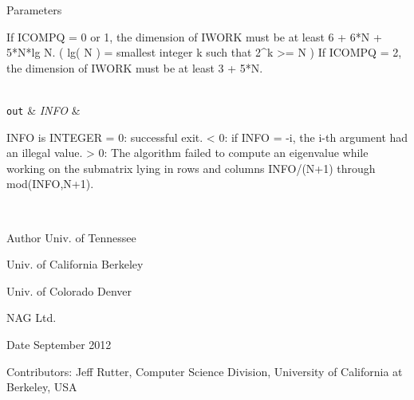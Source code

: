 \begin{DoxyParams}[1]{Parameters}
\begin{DoxyVerb}
         If ICOMPQ = 0 or 1, the dimension of IWORK must be at least
                        6 + 6*N + 5*N*lg N.
                        ( lg( N ) = smallest integer k
                                    such that 2^k >= N )
         If ICOMPQ = 2, the dimension of IWORK must be at least
                        3 + 5*N.\end{DoxyVerb}
\\
\hline
\mbox{\tt out}  & {\em I\+N\+F\+O} & \begin{DoxyVerb}          INFO is INTEGER
          = 0:  successful exit.
          < 0:  if INFO = -i, the i-th argument had an illegal value.
          > 0:  The algorithm failed to compute an eigenvalue while
                working on the submatrix lying in rows and columns
                INFO/(N+1) through mod(INFO,N+1).\end{DoxyVerb}
 \\
\hline
\end{DoxyParams}
\begin{DoxyAuthor}{Author}
Univ. of Tennessee 

Univ. of California Berkeley 

Univ. of Colorado Denver 

N\+A\+G Ltd. 
\end{DoxyAuthor}
\begin{DoxyDate}{Date}
September 2012 
\end{DoxyDate}
\begin{DoxyParagraph}{Contributors\+: }
Jeff Rutter, Computer Science Division, University of California at Berkeley, U\+S\+A 
\end{DoxyParagraph}
